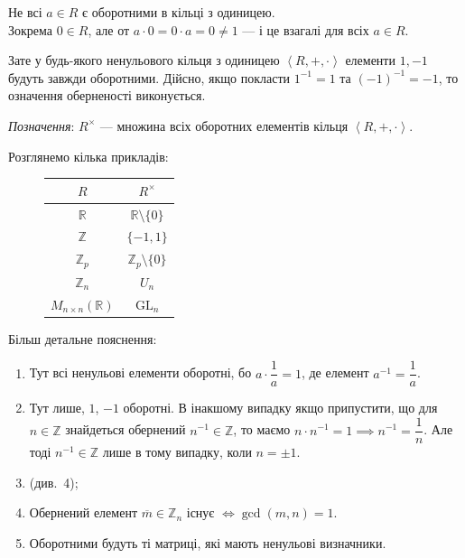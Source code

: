 \documentclass{math_library}
\begin{document}
\begin{remark}
Не всі $a \in R$ є оборотними в кільці з одиницею.\\
Зокрема $0 \in R$, але от $a \cdot 0 = 0 \cdot a = 0 \neq 1$ --- і це взагалі для всіх $a \in R$.
\end{remark}

\begin{remark}
Зате у будь-якого ненульового кільця з одиницею $\left<R,+,\cdot \right>$ елементи $1,-1$ будуть завжди оборотними. Дійсно, якщо покласти $1^{-1} = 1$ та $(-1)^{-1} = -1$, то означення оберненості виконується.
\end{remark}

\textit{Позначення}: $R^\times$ --- множина всіх оборотних елементів кільця $\left<R,+,\cdot \right>$.

\begin{example}
Розглянемо кілька прикладів:
\begin{figure}[H]
\centering
\begin{tabular}{c|c}
$R$ & $R^\times$ \\
\hline
$\mathbb{R}$ & $\mathbb{R} \setminus \{0\}$ \\
$\mathbb{Z}$ & $\{-1,1\}$ \\
$\mathbb{Z}_p$ & $\mathbb{Z}_p \setminus \{0\}$ \\
$\mathbb{Z}_n$ & $U_n$ \\
$M_{n \times n}(\mathbb{R})$ & $\mathrm{GL}_n$ \\
\end{tabular}
\end{figure}
Більш детальне пояснення:
\begin{enumerate}[wide=0pt,label={\arabic*.}]
\item Тут всі ненульові елементи оборотні, бо $a \cdot \dfrac{1}{a} = 1$, де елемент $a^{-1} = \dfrac{1}{a}$.
\item Тут лише, $1$, $-1$ оборотні. В інакшому випадку якщо припустити, що для $n \in \mathbb{Z}$ знайдеться обернений $n^{-1} \in \mathbb{Z}$, то маємо $n \cdot n^{-1} = 1 \implies n^{-1} = \dfrac{1}{n}$. Але тоді $n^{-1} \in \mathbb{Z}$ лише в тому випадку, коли $n = \pm 1$.
\item (див.\ 4);
\item Обернений елемент $\overline{m} \in \mathbb{Z}_n$ існує $\iff \gcd(m,n) = 1$.
\item Оборотними будуть ті матриці, які мають ненульові визначники.
\end{enumerate}
\end{example}
\end{document}
